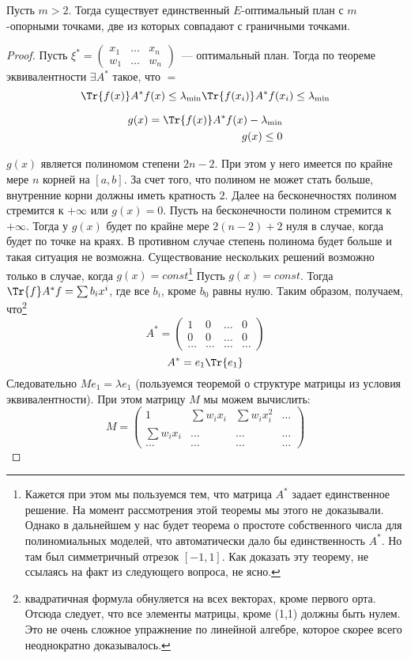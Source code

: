\begin{thm}
Пусть $m > 2$. Тогда существует единственный $E$-оптимальный план с $m$-опорными точками, две из которых совпадают с граничными точками.
\end{thm}
\begin{proof}
Пусть $\xi^* = \begin{pmatrix} x_1 & … & x_n \\ w_1 & … & w_n \end{pmatrix}$ — оптимальный план. Тогда по теореме эквивалентности $\exists A^{*}$ такое, что $=$
\begin{equation}
\Tr{f(x)}A^{*}f(x) \leq \lambda_{\min} \\
\Tr{f(x_i)}A^{*}f(x_i) \leq \lambda_{\min}
\end{equation}

\begin{equation}
\begin{split}
g(x) = \Tr{f(x)}A^{*} f(x) - \lambda_{\min} \\
g(x) \leq 0
\end{split}
\end{equation}

$g(x)$ является полиномом степени $2n-2$. При этом у него имеется по крайне мере $n$ корней на $[a,b]$. За счет того, что полином не может стать больше, внутренние корни должны иметь кратность $2$. Далее на бесконечностях полином стремится к $+\infty$ или $g(x) =0$. Пусть на бесконечности полином стремится к $+\infty$. Тогда у $g(x)$
будет по крайне мере  $2(n-2)+2$ нуля в случае, когда будет по точке на краях. В противном случае степень полинома будет больше и такая ситуация не возможна.  
Существование нескольких решений возможно только в случае, когда $g(x) = const$\footnote{Кажется при этом мы пользуемся тем, что матрица $A^{*}$ задает единственное решение. На момент рассмотрения этой теоремы мы этого не доказывали. Однако в дальнейшем у нас будет теорема о простоте собственного числа для полиномиальных моделей, что автоматически дало бы единственность  $A^{*}$. Но там был симметричный отрезок $[-1,1]$. Как доказать эту теорему, не ссылаясь на факт из следующего вопроса, не ясно.} 
Пусть $g(x) = const$. Тогда $\Tr{f}A^{*}f = \sum b_i x^i$,  где все $b_i$, кроме $b_0$ равны нулю. Таким образом, получаем, что\footnote{квадратичная формула обнуляется на всех векторах, кроме первого орта. Отсюда следует, что все элементы матрицы, кроме (1,1) должны быть нулем. Это не очень сложное упражнение по линейной алгебре, которое скорее всего неоднократно доказывалось.} 
$$ A^{*} = \begin{pmatrix} 1 & 0 & … & 0 \\ 0 & 0 & … & 0 \\ … & … & … & … \end{pmatrix}$$
$$A^{*} = e_1 \Tr{e_1}$$
Следовательно $Me_1 = \lambda e_1$ (пользуемся теоремой о структуре матрицы из условия эквивалентности). При этом матрицу $M$ мы можем вычислить:
$$ M = \begin{pmatrix} 1 & \sum w_ix_i & \sum w_ix_i^2 & … \\ \sum w_i x_i & … & … & …\\  … & … & … & … \end{pmatrix} $$


\end{proof}
